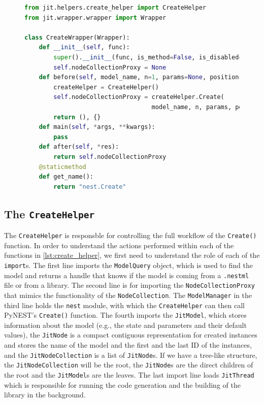 \begin{figure}[ht!]
    \centering
    \begin{lstlisting}[language=Python, label=lst:create_wrapper, caption={The \texttt{CreateWrapper}}]
from jit.helpers.create_helper import CreateHelper
from jit.wrapper.wrapper import Wrapper

class CreateWrapper(Wrapper):
    def __init__(self, func):
        super().__init__(func, is_method=False, is_disabled=False)
        self.nodeCollectionProxy = None
    def before(self, model_name, n=1, params=None, positions=None):
        createHelper = CreateHelper()
        self.nodeCollectionProxy = createHelper.Create(
                                   model_name, n, params, positions)
        return (), {}
    def main(self, *args, **kwargs):
        pass
    def after(self, *res):
        return self.nodeCollectionProxy
    @staticmethod
    def get_name():
        return "nest.Create"
\end{lstlisting}
\end{figure}

\subsection{The \texttt{CreateHelper}}

The \texttt{CreateHelper} is responsble for controlling the full workflow of the \texttt{Create()} function. In order to understand the actions performed within each of the functions in \autoref{lst:create_helper}, we first need to understand the role of each of the \texttt{import}s. The first line imports the \texttt{ModelQuery} object, which is used to find the model and returns a handle that knows if the model is coming from a \texttt{.nestml} file or from a library. The second line is for importing the \texttt{NodeCollectionProxy} that mimics the functionality of the \texttt{NodeCollection}. The \texttt{ModelManager} in the third line holds the \texttt{nest} module, with which the \texttt{CreateHelper} can then call PyNEST's \texttt{Create()} function. The fourth imports the \texttt{JitModel}, which stores information about the model (e.g., the state and parameters and their default values), the \texttt{JitNode} is a compact contiguous representation for created instances and stores the name of the model and the first and the last ID of the instances, and the \texttt{JitNodeCollection} is a list of \texttt{JitNode}s. If we have a tree-like structure, the \texttt{JitNodeCollection} will be the root, the \texttt{JitNode}s are the direct children of the root and the \texttt{JitModel}s are the leaves. The last import line loads \texttt{JitThread} which is responsible for running the code generation and the building of the library in the background.

